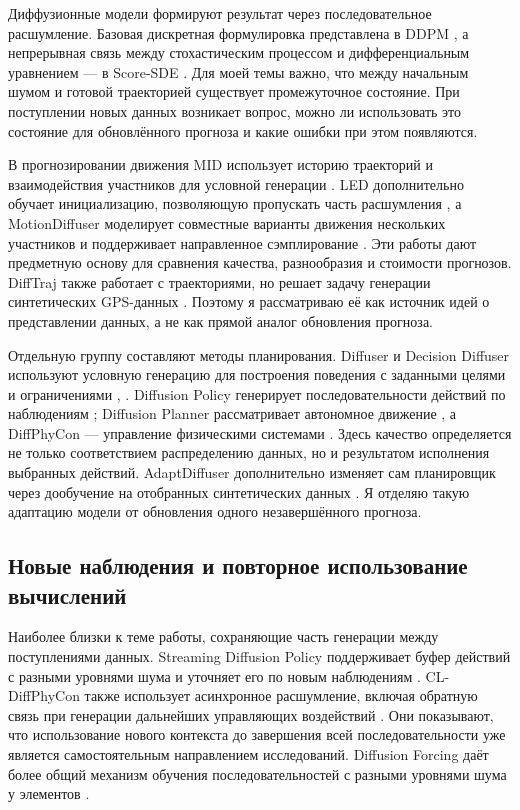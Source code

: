 Диффузионные модели формируют результат через последовательное расшумление. Базовая дискретная формулировка представлена в DDPM \citep{p37}, а непрерывная связь между стохастическим процессом и дифференциальным уравнением — в Score-SDE \citep{p38}. Для моей темы важно, что между начальным шумом и готовой траекторией существует промежуточное состояние. При поступлении новых данных возникает вопрос, можно ли использовать это состояние для обновлённого прогноза и какие ошибки при этом появляются.

В прогнозировании движения MID использует историю траекторий и взаимодействия участников для условной генерации \citep{p09}. LED дополнительно обучает инициализацию, позволяющую пропускать часть расшумления \citep{p10}, а MotionDiffuser моделирует совместные варианты движения нескольких участников и поддерживает направленное сэмплирование \citep{p11}. Эти работы дают предметную основу для сравнения качества, разнообразия и стоимости прогнозов. DiffTraj также работает с траекториями, но решает задачу генерации синтетических GPS-данных \citep{p12}. Поэтому я рассматриваю её как источник идей о представлении данных, а не как прямой аналог обновления прогноза.

Отдельную группу составляют методы планирования. Diffuser и Decision Diffuser используют условную генерацию для построения поведения с заданными целями и ограничениями \citep{p14}, \citep{p15}. Diffusion Policy генерирует последовательности действий по наблюдениям \citep{p17}; Diffusion Planner рассматривает автономное движение \citep{p13}, а DiffPhyCon — управление физическими системами \citep{p18}. Здесь качество определяется не только соответствием распределению данных, но и результатом исполнения выбранных действий. AdaptDiffuser дополнительно изменяет сам планировщик через дообучение на отобранных синтетических данных \citep{p16}. Я отделяю такую адаптацию модели от обновления одного незавершённого прогноза.

\subsection{Новые наблюдения и повторное использование вычислений}

Наиболее близки к теме работы, сохраняющие часть генерации между поступлениями данных. Streaming Diffusion Policy поддерживает буфер действий с разными уровнями шума и уточняет его по новым наблюдениям \citep{p01}. CL-DiffPhyCon также использует асинхронное расшумление, включая обратную связь при генерации дальнейших управляющих воздействий \citep{p02}. Они показывают, что использование нового контекста до завершения всей последовательности уже является самостоятельным направлением исследований. Diffusion Forcing даёт более общий механизм обучения последовательностей с разными уровнями шума у элементов \citep{p05}.

